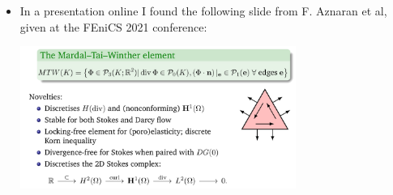 \begin{itemize}
 
\item In a presentation online I found the following slide from F. Aznaran et al, 
given at the FEniCS 2021 conference:

\begin{center}
\includegraphics[width=9cm]{images/pair_mtw/aznaran3}
\end{center}













\end{itemize}

